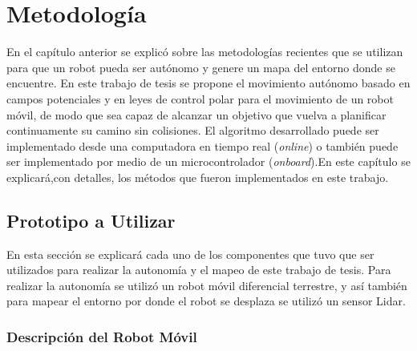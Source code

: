 \chapter{Metodolog\'ia}

En el cap\'itulo anterior se explic\'o sobre las metodolog\'ias recientes que se 
utilizan para que un robot pueda ser aut\'onomo y genere un mapa 
del entorno donde se encuentre. En este trabajo de tesis se propone 
el movimiento aut\'onomo basado en campos potenciales y en leyes de control 
polar para el movimiento de un robot m\'ovil, de modo que sea capaz de alcanzar 
un objetivo que vuelva a planificar continuamente su camino sin colisiones. El 
algoritmo desarrollado puede ser implementado desde una computadora en tiempo 
real (\textit{online}) o tambi\'en puede ser implementado por medio de un 
microcontrolador (\textit{onboard}).En este cap\'itulo se explicar\'a,con detalles, 
los m\'etodos que fueron implementados en este trabajo.

\section{Prototipo a Utilizar}
En esta secci\'on se explicar\'a cada uno de los componentes que tuvo que 
ser utilizados para realizar la autonom\'ia y el mapeo de este trabajo de 
tesis. Para realizar la autonom\'ia se utiliz\'o un robot m\'ovil diferencial 
terrestre, y as\'i tambi\'en para mapear el entorno por donde el robot se 
desplaza se utiliz\'o un sensor Lidar.

\subsection{Descripci\'on del Robot M\'ovil}

